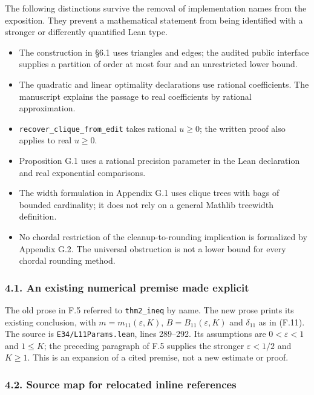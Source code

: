 \documentclass[english,11pt,a4paper]{article}
\providecommand{\tightlist}{\setlength{\itemsep}{0pt}\setlength{\parskip}{0pt}}
\begin{document}
The following distinctions survive the removal of implementation names
from the exposition. They prevent a mathematical statement from being
identified with a stronger or differently quantified Lean type.

\begin{itemize}
\tightlist
\item
  The construction in §6.1 uses triangles and edges; the audited public
  interface supplies a partition of order at most four and an
  unrestricted lower bound.
\item
  The quadratic and linear optimality declarations use rational
  coefficients. The manuscript explains the passage to real coefficients
  by rational approximation.
\item
  \nolinkurl{recover_clique_from_edit} takes rational \(u\ge0\); the
  written proof also applies to real \(u\ge0\).
\item
  Proposition G.1 uses a rational precision parameter in the Lean
  declaration and real exponential comparisons.
\item
  The width formulation in Appendix G.1 uses clique trees with bags of
  bounded cardinality; it does not rely on a general Mathlib treewidth
  definition.
\item
  No chordal restriction of the cleanup-to-rounding implication is
  formalized by Appendix G.2. The universal obstruction is not a lower
  bound for every chordal rounding method.
\end{itemize}

\subsubsection{4.1. An existing numerical premise made
explicit}\label{an-existing-numerical-premise-made-explicit}

The old prose in F.5 referred to \nolinkurl{thm2_ineq} by name. The new
prose prints its existing conclusion, with \(m=m_{11}(\varepsilon,K)\),
\(B=B_{11}(\varepsilon,K)\) and \(\delta_{11}\) as in (F.11). The source
is \nolinkurl{E34/L11Params.lean}, lines 289--292. Its assumptions are
\(0<\varepsilon<1\) and \(1\le K\); the preceding paragraph of F.5
supplies the stronger \(\varepsilon<1/2\) and \(K\ge1\). This is an
expansion of a cited premise, not a new estimate or proof.

\subsubsection{4.2. Source map for relocated inline
references}\label{source-map-for-relocated-inline-references}
\end{document}
